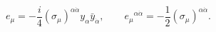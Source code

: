 \begin{equation}
e_\mu=-\frac{i}4
(\sigma_\mu)^{\alpha\dot\alpha} y_\alpha \bar y_{\dot\alpha}, \qquad
e_\mu{}^{\alpha\dot\alpha} = -\frac12 (\sigma_\mu)^{\alpha\dot\alpha}.
 \label{eq:usefull}
\end{equation}

